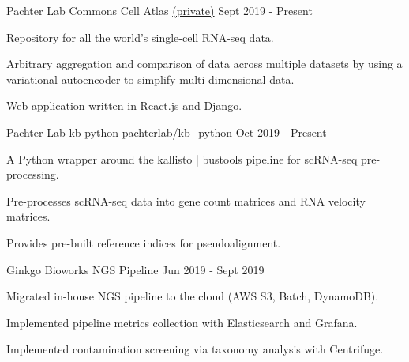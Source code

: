 

\begin{cventries}

\cventry
  {Pachter Lab} %
  {Commons Cell Atlas} %
  {\faGithub\phantom{a}\href{https://github.com/pachterlab/cca-webapp}{(private)}} %
  {Sept 2019 - Present} %
  {
    \begin{cvitems} %
      \item {Repository for all the world's single-cell RNA-seq data.}
      \item {Arbitrary aggregation and comparison of data across multiple datasets by using a variational autoencoder to simplify multi-dimensional data.}
      \item {Web application written in React.js and Django.}
    \end{cvitems}
  }

\cventry
  {Pachter Lab} %
  {\href{https://github.com/pachterlab/kb_python}{kb-python}} %
  {\faGithub\phantom{a}\href{https://github.com/pachterlab/kb_python}{pachterlab/kb\_python}} %
  {Oct 2019 - Present} %
  {
    \begin{cvitems} %
      \item {A Python wrapper around the kallisto | bustools pipeline for scRNA-seq pre-processing.}
      \item {Pre-processes scRNA-seq data into gene count matrices and RNA velocity matrices.}
      \item {Provides pre-built reference indices for pseudoalignment.}
    \end{cvitems}
  }

\cventry
    {Ginkgo Bioworks}
    {NGS Pipeline}
    {}
    {Jun 2019 - Sept 2019}
    {
     \begin{cvitems} %
       \item {Migrated in-house NGS pipeline to the cloud (AWS S3, Batch, DynamoDB).}
       \item {Implemented pipeline metrics collection with Elasticsearch and Grafana.}
       \item {Implemented contamination screening via taxonomy analysis with Centrifuge.}
      \end{cvitems}
    }


\end{cventries}

